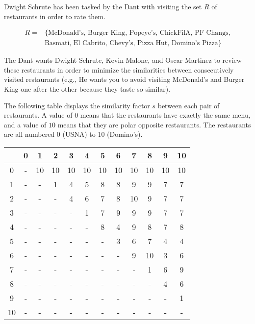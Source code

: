 \documentclass[12pt]{exam}
\begin{document}
\begin{questions}
\begin{parts}
\end{parts}
\newpage

\question 


Dwight Schrute has been tasked by the Dant with visiting the set $R$ of restaurants in order to rate them.


\begin{align*}
    R = & \{\textrm{McDonald's, Burger King, Popeye's, ChickFilA, PF Changs,}\\ 
    &\textrm{Basmati, El Cabrito, Chevy's, Pizza Hut, Domino's Pizza}\}
\end{align*}

\medskip

The Dant wants Dwight Schrute, Kevin Malone, and Oscar Martinez to review these restaurants in order to minimize the similarities between consecutively visited restaurants (e.g., He wants you to avoid visiting McDonald's and Burger King one after the other because they taste so similar). 

The following table displays the similarity factor $s$ between each pair of restaurants. A value of $0$ means that the restaurants have exactly the same menu, and a value of $10$ means that they are polar opposite restaurants. The restaurants are all numbered 0 (USNA) to 10 (Domino's).


\begin{center}
\begin{tabular}{c|ccccccccccc} 
\hline 
  & 0& 1 & 2 & 3 &  4 &  5 & 6 & 7 & 8 & 9 & 10 \\ \hline
 0 & - & 10 & 10 & 10 & 10 & 10 & 10 & 10 & 10 & 10 & 10 \\
 1 & -& - & 1 & 4 & 5 & 8 & 8 & 9 & 9 & 7 & 7 \\
 2 & -& - & - & 4 & 6 & 7 & 8 & 10 & 9 & 7 & 7 \\
 3 & -& - & - & - & 1 & 7 & 9 & 9 & 9 & 7 & 7 \\
 4 & - & - &  - & - & - & 8 & 4 & 9 & 8 & 7 & 8 \\
 5 & - & -& - & - & - & - & 3 & 6 & 7 & 4 & 4 \\
 6 & - & - & -& - & - & - & - & 9 & 10 & 3 & 6 \\
 7  & - & - & -& - & - & - & - & - & 1 & 6 & 9 \\
 8 & - & - & - & -& - & - & - & - & - & 4 & 6 \\
 9 & - & - & - & -& - & - & - & - & - & - & 1 \\
 10 & - & - & - & -& - & - & - & - & - & - & - \\
\end{tabular}
\end{center}




\end{questions}
\end{document}
